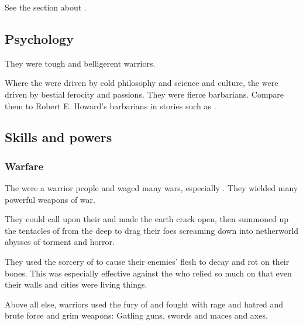\subsubsection{\Ophidians}
See the section about . 









\subsection{Psychology}
They were tough and belligerent warriors. 

Where the \ophidians were driven by cold philosophy and science and culture, the \aryothim were driven by bestial ferocity and passions. 
They were fierce barbarians. 
Compare them to Robert E. Howard's barbarians in stories such as \cite{RobertEHoward:TheValleyoftheLost}. 









\subsection{Skills and powers}





\subsubsection{Warfare}
The \aryoth were a warrior people and waged many wars, especially .
They wielded many powerful weapons of war. 

They could call upon their  and made the earth crack open, then summoned up the tentacles of  from the deep to drag their foes screaming down into netherworld abysses of torment and horror. 

They used the sorcery of \Yagnathul to cause their enemies' flesh to decay and rot on their bones.
This was especially effective against the \ophidians who relied so much on  that even their walls and cities were living things.

Above all else, \Aryoth warriors used the fury of \Malgaddon and fought with rage and hatred and brute force and grim weapons: Gatling guns, swords and maces and axes. 









